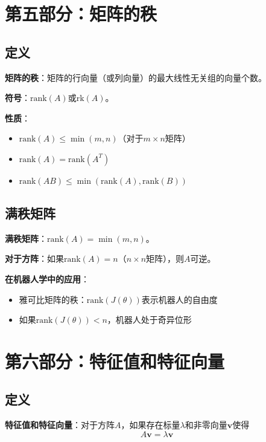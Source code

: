 \documentclass[12pt,a4paper]{article}
\begin{document}
\section{第五部分：矩阵的秩}

\subsection{定义}

\textbf{矩阵的秩}：矩阵的行向量（或列向量）的最大线性无关组的向量个数。

\textbf{符号}：$\text{rank}(A)$或$\text{rk}(A)$。

\textbf{性质}：
\begin{itemize}
\item $\text{rank}(A) \leq \min(m, n)$（对于$m \times n$矩阵）
\item $\text{rank}(A) = \text{rank}(A^T)$
\item $\text{rank}(AB) \leq \min(\text{rank}(A), \text{rank}(B))$
\end{itemize}

\subsection{满秩矩阵}

\textbf{满秩矩阵}：$\text{rank}(A) = \min(m, n)$。

\textbf{对于方阵}：如果$\text{rank}(A) = n$（$n \times n$矩阵），则$A$可逆。

\textbf{在机器人学中的应用}：
\begin{itemize}
\item 雅可比矩阵的秩：$\text{rank}(J(\theta))$表示机器人的自由度
\item 如果$\text{rank}(J(\theta)) < n$，机器人处于奇异位形
\end{itemize}

\section{第六部分：特征值和特征向量}

\subsection{定义}

\textbf{特征值和特征向量}：对于方阵$A$，如果存在标量$\lambda$和非零向量$\bm{v}$使得
\begin{equation}
A\bm{v} = \lambda \bm{v}
\end{equation}
\end{document}
